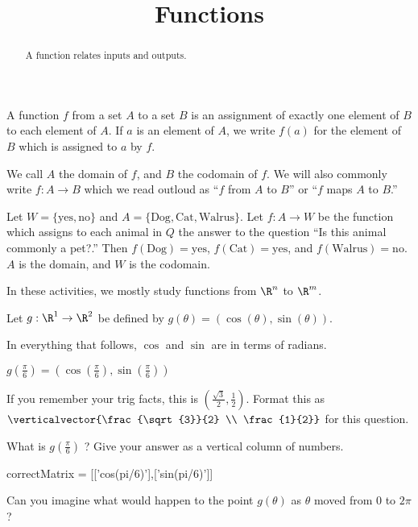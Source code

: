 \documentclass{ximera}
\title{Functions}
\begin{document}
\begin{abstract}
  A function relates inputs and outputs.
\end{abstract}

\begin{definition}
  A function $f$ from a set $A$ to a set $B$ is an assignment of
  exactly one element of $B$ to each element of $A$.  If $a$ is an
  element of $A$, we write $f(a)$ for the element of $B$ which is
  assigned to $a$ by $f$.
\end{definition}

We call $A$ the domain of $f$, and $B$ the codomain of $f$.  We will
also commonly write $f:A \to B$ which we read outloud as ``$f$ from
$A$ to $B$'' or ``$f$ maps $A$ to $B$.''

\begin{example}
  Let $W =\{ \text{yes},\text{no}\}$ and $A = \{ \text{Dog},
  \text{Cat}, \text{Walrus}\}$.  Let $f:A \to W$ be the function which
  assigns to each animal in $Q$ the answer to the question ``Is this
  animal commonly a pet?.''  Then $f(\text{Dog}) = \text{yes}$,
  $f(\text{Cat}) = \text{yes}$, and $f(\text{Walrus}) =
  \text{no}$.  $A$ is the domain, and $W$ is the codomain.
\end{example}

In these activities, we mostly study functions from $\R^n$ to $\R^m$.

\begin{question}
  Let $g:\R^1 \to \R^2$ be defined by $g(\theta) = (\cos(\theta),\sin(\theta))$.
  \begin{solution}
    \begin{hint}
      \begin{warning}
        In everything that follows, $\cos$ and $\sin$ are in terms of radians.
      \end{warning}
    \end{hint}
    \begin{hint}
      $g(\frac{\pi}{6}) = (\cos(\frac{\pi}{6}),\sin(\frac{\pi}{6}))$
    \end{hint}
    \begin{hint}
      If you remember your trig facts, this is
      $(\frac{\sqrt{3}}{2},\frac{1}{2})$.  Format this as
      $\verticalvector{\frac{\sqrt{3}}{2} \\ \frac{1}{2}}$ for
      this question.
    \end{hint}
    What is $g(\frac{\pi}{6})$ ?  Give your answer as a vertical column of numbers.
    \begin{matrix-answer}
      correctMatrix = [['cos(pi/6)'],['sin(pi/6)']]
    \end{matrix-answer}
  \end{solution}
  
  Can you imagine what would happen to the point $g(\theta)$ as $\theta$ moved from $0$ to $2\pi$?
\end{question}
\end{document}
